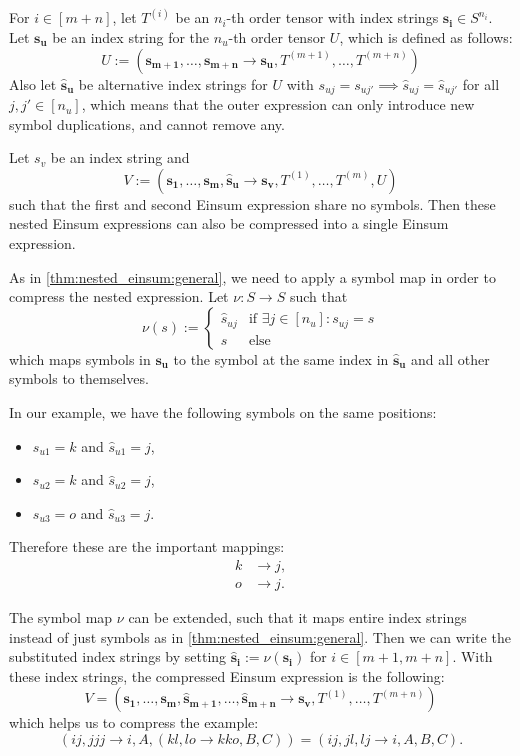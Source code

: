 \begin{theorem}
    \label{thm:nested_einsum:introduce_duplications}

    For $i \in [m + n]$, let $T^{(i)}$ be an $n_i$-th order tensor with index strings $\bm{s_i} \in S^{n_i}$.
    Let $\bm{s_u}$ be an index string for the $n_u$-th order tensor $U$, which is defined as follows:
    $$U := (\bm{s_{m + 1}},\dots,\bm{s_{m + n}} \rightarrow \bm{s_u}, T^{(m + 1)},\dots,T^{(m + n)})$$
    Also let $\bm{\hat{s}_u}$ be alternative index strings for $U$ with $s_{uj} = s_{uj'} \implies \hat{s}_{uj} = \hat{s}_{uj'}$ for all $j, j' \in [n_u]$,
    which means that the outer expression can only introduce new symbol duplications, and cannot remove any.

    Let $s_v$ be an index string and
    $$V := (\bm{s_1},\dots,\bm{s_m}, \bm{\hat{s}_u} \rightarrow \bm{s_v}, T^{(1)},\dots,T^{(m)}, U)$$
    such that the first and second Einsum expression share no symbols.
    Then these nested Einsum expressions can also be compressed into a single Einsum expression.

    As in \cref{thm:nested_einsum:general}, we need to apply a symbol map in order to compress the nested expression.
    Let $\nu: S \rightarrow S$ such that
    $$\nu(s) := \begin{cases}
            \hat{s}_{uj} & \text{if }\exists j \in [n_u]: s_{uj} = s \\
            s            & \text{else}
        \end{cases}$$
    which maps symbols in $\bm{s_u}$ to the symbol at the same index in $\bm{\hat{s}_u}$ and all other symbols to themselves.

    In our example, we have the following symbols on the same positions:
    \begin{itemize}
        \item $s_{u1} = k$ and $\hat{s}_{u1} = j$,
        \item $s_{u2} = k$ and $\hat{s}_{u2} = j$,
        \item $s_{u3} = o$ and $\hat{s}_{u3} = j$.
    \end{itemize}
    Therefore these are the important mappings:
    \begin{align*}
        k & \rightarrow j, \\
        o & \rightarrow j.
    \end{align*}

    The symbol map $\nu$ can be extended, such that it maps entire index strings instead of just symbols as in \cref{thm:nested_einsum:general}.
    Then we can write the substituted index strings by setting $\bm{\hat{s}_i} := \nu(\bm{s_i})$ for $i \in [m + 1, m + n]$.
    With these index strings, the compressed Einsum expression is the following:
    $$V = (\bm{s_1},\dots,\bm{s_m}, \bm{\hat{s}_{m + 1}}, \dots, \bm{\hat{s}_{m + n}} \rightarrow \bm{s_v}, T^{(1)},\dots,T^{(m + n)})$$
    which helps us to compress the example:
    $$(ij, jjj \rightarrow i, A, (kl, lo \rightarrow kko, B, C)) = (ij, jl, lj \rightarrow i, A, B, C).$$
\end{theorem}

